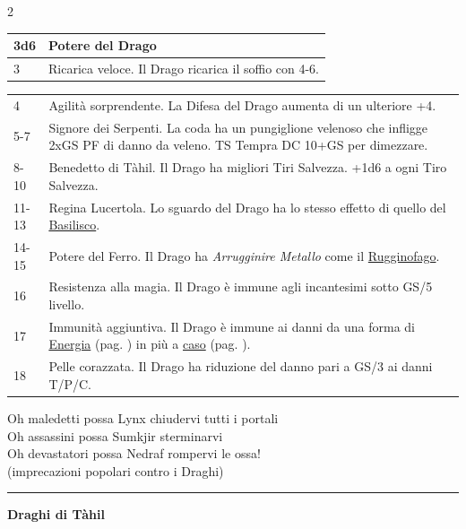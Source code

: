 \begin{multicols}{2}
{\noindent\begin{tabularx}{\linewidth}{lX}
\toprule
\rowcolor{gray!20}\textbf{3d6}& \textbf{Potere del Drago}\\
\toprule
3& Ricarica veloce. Il Drago ricarica il soffio con 4-6. \\
\end{tabularx}
\noindent\begin{tabularx}{\linewidth}{lX}
\rowcolor{gray!20}4& Agilità sorprendente. La Difesa del Drago aumenta di un ulteriore +4. \\
5-7 & Signore dei Serpenti. La coda ha un pungiglione velenoso che infligge 2xGS PF di danno da veleno. TS Tempra DC 10+GS per dimezzare.\\
\rowcolor{gray!20}8-10 & Benedetto di Tàhil. Il Drago ha migliori Tiri Salvezza. +1d6 a ogni Tiro Salvezza.\\
11-13 & Regina Lucertola. Lo sguardo del Drago ha lo stesso effetto di quello del \hyperlink{Basilisco}{Basilisco}.\\
\rowcolor{gray!20}14-15 & Potere del Ferro. Il Drago ha \emph{Arrugginire Metallo} come il \hyperlink{Rugginofago}{Rugginofago}.\\
16 & Resistenza alla magia. Il Drago è immune agli incantesimi sotto GS/5 livello.\\
\rowcolor{gray!20}17 & Immunità aggiuntiva. Il Drago è immune ai danni da una forma di \hyperlink{elencoenergia}{Energia} (pag. \pageref{elencoenergia}) in più a \hyperlink{fontienergia}{caso} (pag. \pageref{fontienergia}).\\
18 & Pelle corazzata. Il Drago ha riduzione del danno pari a GS/3 ai danni T/P/C.
\end{tabularx}

\medskip

\begin{enfasi}{
Oh maledetti possa Lynx chiudervi tutti i portali\\
Oh assassini possa Sumkjir sterminarvi\\
Oh devastatori possa Nedraf rompervi le ossa!\\
(imprecazioni popolari contro i Draghi)}\end{enfasi}

\medskip

\rule{\linewidth}{2pt}

\medskip

\textbf{Draghi di Tàhil}


}
\end{multicols}
